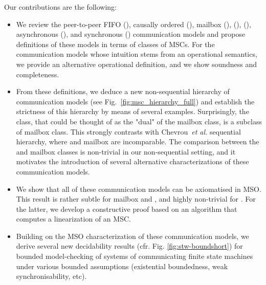 
Our contributions are the following:
\begin{itemize}
	\item We review the peer-to-peer FIFO (\pp), causally ordered (\co), mailbox (\mb), \onen (\onensymb), \nn (\nnsymb), asynchronous (\asy), and synchronous (\rsc) communication models
	and propose definitions of these models in terms of classes of MSCs. For the communication models whose intuition stems from
	an operational semantics, we provide an alternative operational definition, and we show soundness and completeness.

	\item From these definitions, we deduce a new non-sequential hierarchy of communication models (see Fig.~\ref{fig:msc_hierarchy_full})
	and establish the strictness of this hierarchy by means of several examples.
	Surprisingly, the \onen class, that could be thought of as the "dual" of the mailbox class, is a subclass of mailbox class. This strongly
	contrasts with Chevrou~\emph{et al.} sequential hierarchy, where \onen and mailbox are incomparable. The comparison between
	the \onen and mailbox classes is non-trivial in our non-sequential setting, and it motivates the introduction
	of several  alternative characterizations of these communication models.

	\item We show that all of these communication models can be axiomatised in MSO. This result is rather subtle for mailbox and \onen, and highly non-trivial for \nn. For the latter, we develop a constructive proof based on an
	algorithm that computes a \nn linearization of an MSC.

	\item Building on the MSO characterization of these communication models, we derive several new decidability results (cfr. Fig. \ref{fig:stw-boundshort}) for bounded
	model-checking of systems of communicating finite state machines under various bounded assumptions (existential boundedness, weak synchronisability, etc).
\end{itemize}



